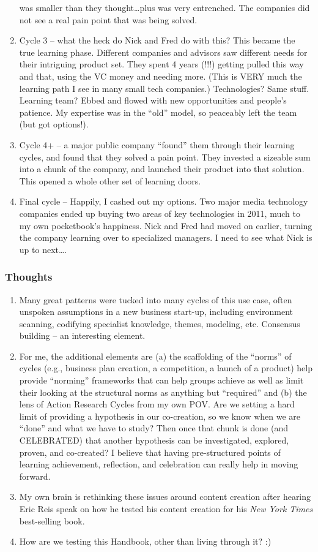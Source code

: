 \begin{enumerate}
  was smaller than they thought\ldots{}plus was very entrenched. The
  companies did not see a real pain point that was being solved.
\item
  Cycle 3 -- what the heck do Nick and Fred do with this? This became
  the true learning phase. Different companies and advisors saw
  different needs for their intriguing product set. They spent 4 years
  (!!!) getting pulled this way and that, using the VC money and needing
  more. (This is VERY much the learning path I see in many small tech
  companies.) Technologies? Same stuff. Learning team? Ebbed and flowed
  with new opportunities and people's patience. My expertise was in the
  ``old'' model, so peaceably left the team (but got options!).
\item
  Cycle 4+ -- a major public company ``found'' them through their
  learning cycles, and found that they solved a pain point. They
  invested a sizeable sum into a chunk of the company, and launched
  their product into that solution. This opened a whole other set of
  learning doors.
\item
  Final cycle -- Happily, I cashed out my options. Two major media
  technology companies ended up buying two areas of key technologies in
  2011, much to my own pocketbook's happiness. Nick and Fred had moved
  on earlier, turning the company learning over to specialized managers.
  I need to see what Nick is up to next\ldots{}.
\end{enumerate}
\subsubsection{Thoughts}

\begin{enumerate}
\item
  Many great patterns were tucked into many cycles of this use case,
  often unspoken assumptions in a new business start-up, including
  environment scanning, codifying specialist knowledge, themes,
  modeling, etc. Consensus building -- an interesting element.
\item
  For me, the additional elements are (a) the scaffolding of the
  ``norms'' of cycles (e.g., business plan creation, a competition, a
  launch of a product) help provide ``norming'' frameworks that can help
  groups achieve as well as limit their looking at the structural norms
  as anything but ``required'' and (b) the lens of Action Research
  Cycles from my own POV. Are we setting a hard limit of providing a
  hypothesis in our co-creation, so we know when we are ``done'' and
  what we have to study? Then once that chunk is done (and CELEBRATED)
  that another hypothesis can be investigated, explored, proven, and
  co-created? I believe that having pre-structured points of learning
  achievement, reflection, and celebration can really help in moving
  forward.
\item
  My own brain is rethinking these issues around content creation after
  hearing Eric Reis speak on how he tested his content creation for his
  \emph{New York Times} best-selling book.
\item
  How are we testing this Handbook, other than living through it? :)
\end{enumerate}
